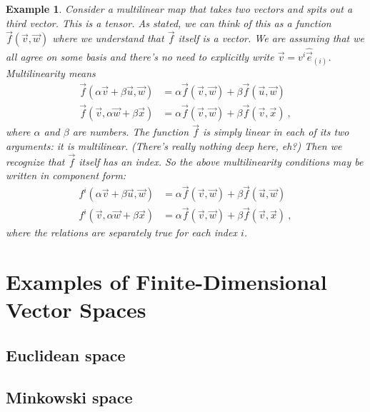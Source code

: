\documentclass[
  11pt,
	colorful,
	raggedright,
]{tufte-style-thesis-flip}
\newtheorem{example}{Example}[section]
\begin{document}
\begin{example}
Consider a multilinear map that takes two vectors and spits out a third vector. This is a tensor. As stated, we can think of this as a function $\vec{f}(\vec{v},\vec{w})$ where we understand that $\vec{f}$ itself is a vector. We are assuming that we all agree on some basis and there's no need to explicitly write $\vec{v}=v^i\hat{\vec{e}}_{(i)}$. Multilinearity means
\begin{align}
  \vec{f}(\alpha\vec{v}+\beta\vec{u},\vec{w}) &= 
  \alpha\vec{f}(\vec{v},\vec{w}) +
  \beta \vec{f}(\vec{u},\vec{w})
  \\
  \vec{f}(\vec{v},\alpha\vec{w}+\beta\vec{x}) &= 
  \alpha\vec{f}(\vec{v},\vec{w}) +
  \beta \vec{f}(\vec{v},\vec{x}) \ ,
\end{align}
where $\alpha$ and $\beta$ are numbers. The function $\vec{f}$ is simply linear in each of its two arguments: it is \emph{multi}linear. (There's really nothing deep here, eh?) Then we recognize that $\vec{f}$ itself has an index. So the above multilinearity conditions may be written in component form:
\begin{align}
  f^i(\alpha\vec{v}+\beta\vec{u},\vec{w}) &= 
  \alpha\vec{f}(\vec{v},\vec{w}) +
  \beta \vec{f}(\vec{u},\vec{w})
  \\
  f^i(\vec{v},\alpha\vec{w}+\beta\vec{x}) &= 
  \alpha\vec{f}(\vec{v},\vec{w}) +
  \beta \vec{f}(\vec{v},\vec{x}) \ ,
\end{align}
where the relations are separately true for each index $i$.
\end{example}

\section{Examples of Finite-Dimensional Vector Spaces}




\subsection{Euclidean space}

\subsection{Minkowski space}
\end{document}
